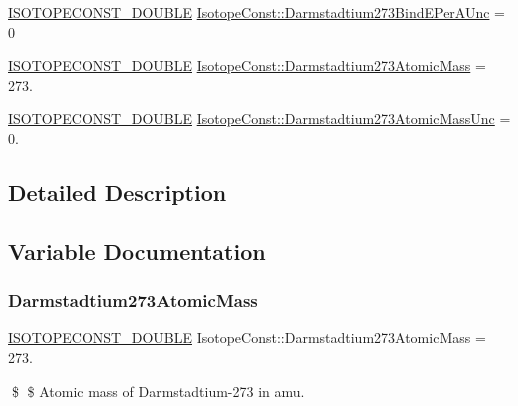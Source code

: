 \begin{DoxyCompactItemize}
\item 
\mbox{\hyperlink{group___isotope_const-_macros_ga8f45a7272ce02c0b4c65c44636ed719a}{I\+S\+O\+T\+O\+P\+E\+C\+O\+N\+S\+T\+\_\+\+D\+O\+U\+B\+LE}} \mbox{\hyperlink{group___isotope_const-_darmstadtium-_ds273_gabe5fa7e0d55cc96e7caa05d25676ca19}{Isotope\+Const\+::\+Darmstadtium273\+Bind\+E\+Per\+A\+Unc}} = 0
\item 
\mbox{\hyperlink{group___isotope_const-_macros_ga8f45a7272ce02c0b4c65c44636ed719a}{I\+S\+O\+T\+O\+P\+E\+C\+O\+N\+S\+T\+\_\+\+D\+O\+U\+B\+LE}} \mbox{\hyperlink{group___isotope_const-_darmstadtium-_ds273_ga5ed0801e51d876da6183dfc40431970d}{Isotope\+Const\+::\+Darmstadtium273\+Atomic\+Mass}} = 273.
\item 
\mbox{\hyperlink{group___isotope_const-_macros_ga8f45a7272ce02c0b4c65c44636ed719a}{I\+S\+O\+T\+O\+P\+E\+C\+O\+N\+S\+T\+\_\+\+D\+O\+U\+B\+LE}} \mbox{\hyperlink{group___isotope_const-_darmstadtium-_ds273_ga1b78e29a232b340d2fef83c20fb47d7d}{Isotope\+Const\+::\+Darmstadtium273\+Atomic\+Mass\+Unc}} = 0.
\end{DoxyCompactItemize}


\subsection{Detailed Description}


\subsection{Variable Documentation}
\mbox{\label{group___isotope_const-_darmstadtium-_ds273_ga5ed0801e51d876da6183dfc40431970d}} 
\subsubsection{\texorpdfstring{Darmstadtium273\+Atomic\+Mass}{Darmstadtium273AtomicMass}}
{\footnotesize\ttfamily \mbox{\hyperlink{group___isotope_const-_macros_ga8f45a7272ce02c0b4c65c44636ed719a}{I\+S\+O\+T\+O\+P\+E\+C\+O\+N\+S\+T\+\_\+\+D\+O\+U\+B\+LE}} Isotope\+Const\+::\+Darmstadtium273\+Atomic\+Mass = 273.}

\$ \$ Atomic mass of Darmstadtium-\/273 in amu. \mbox{\label{group___isotope_const-_darmstadtium-_ds273_ga1b78e29a232b340d2fef83c20fb47d7d}} 
